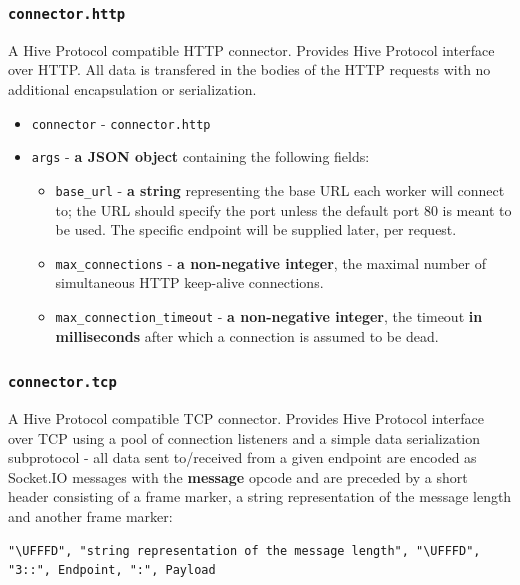 \documentclass[a4paper]{article}
\begin{document}
\subsubsection{\texttt{connector.http}}
\label{sec-8-4-2}
\label{ref-cp_connectors}

A Hive Protocol compatible HTTP connector. Provides Hive Protocol interface over HTTP. All data is transfered in the bodies of the HTTP requests with no additional encapsulation or serialization.


\begin{itemize}
\item \texttt{connector} - \texttt{connector.http}
\item \texttt{args} - \textbf{a JSON object} containing the following fields:
\begin{itemize}
\item \texttt{base\_url} - \textbf{a string} representing the base URL each worker will connect to; the URL should specify the port unless the default port 80 is meant to be used. The specific endpoint will be supplied later, per request.
\item \texttt{max\_connections} - \textbf{a non-negative integer}, the maximal number of simultaneous HTTP keep-alive connections.
\item \texttt{max\_connection\_timeout} - \textbf{a non-negative integer}, the timeout \textbf{in milliseconds} after which a connection is assumed to be dead.
\end{itemize}
\end{itemize}
\subsubsection{\texttt{connector.tcp}}
\label{sec-8-4-3}

A Hive Protocol compatible TCP connector. Provides Hive Protocol interface over TCP using a pool of connection listeners and a simple data serialization subprotocol - all data sent to/received from a given endpoint are encoded as Socket.IO messages with the \textbf{message} opcode and are preceded by a short header consisting of a frame marker, a string representation of the message length and another frame marker:


\begin{verbatim}
"\UFFFD", "string representation of the message length", "\UFFFD", "3::", Endpoint, ":", Payload
\end{verbatim}
\end{document}
